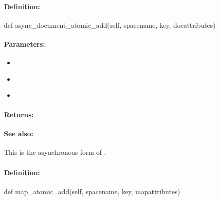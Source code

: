 \paragraph{Definition:}
\begin{pythoncode}
def async_document_atomic_add(self, spacename, key, docattributes)
\end{pythoncode}

\paragraph{Parameters:}
\begin{itemize}[noitemsep]
\item {}\\

\item {}\\

\item {}\\

\end{itemize}

\paragraph{Returns:}


\paragraph{See also:}  This is the asynchronous form of .

\pagebreak
\subsubsection{}
\label{api:python:map_atomic_add}


\paragraph{Definition:}
\begin{pythoncode}
def map_atomic_add(self, spacename, key, mapattributes)
\end{pythoncode}

